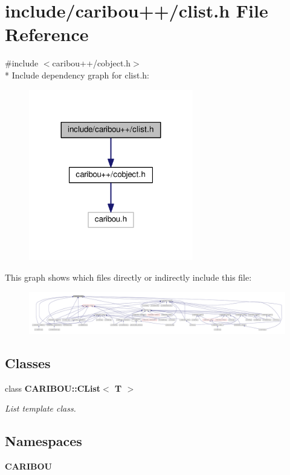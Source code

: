 \section{include/caribou++/clist.h File Reference}
\label{clist_8h}
{\ttfamily \#include $<$caribou++/cobject.\+h$>$}\\*
Include dependency graph for clist.\+h\+:
\nopagebreak
\begin{figure}[H]
\begin{center}
\leavevmode
\includegraphics[width=203pt]{clist_8h__incl}
\end{center}
\end{figure}
This graph shows which files directly or indirectly include this file\+:
\nopagebreak
\begin{figure}[H]
\begin{center}
\leavevmode
\includegraphics[width=350pt]{clist_8h__dep__incl}
\end{center}
\end{figure}
\subsection*{Classes}
\begin{DoxyCompactItemize}
\item 
class {\bf C\+A\+R\+I\+B\+O\+U\+::\+C\+List$<$ T $>$}
\begin{DoxyCompactList}\small\item\em List template class. \end{DoxyCompactList}\end{DoxyCompactItemize}
\subsection*{Namespaces}
\begin{DoxyCompactItemize}
\item 
 {\bf C\+A\+R\+I\+B\+OU}
\end{DoxyCompactItemize}
